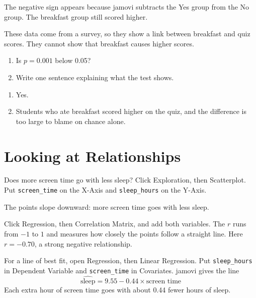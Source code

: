 The negative sign appears because jamovi subtracts the Yes group from the No group. The breakfast group still scored higher.

These data come from a survey, so they show a link between breakfast and quiz scores. They cannot show that breakfast causes higher scores.

\begin{Exercise}[title={Reading the t-Test}, label={ex:jamovi-ttest}]
\begin{enumerate}
\item Is $p = 0.001$ below 0.05?
\item Write one sentence explaining what the test shows.
\end{enumerate}
\end{Exercise}
\begin{Answer}[ref={ex:jamovi-ttest}]
\begin{enumerate}
\item Yes.
\item Students who ate breakfast scored higher on the quiz, and the difference is too large to blame on chance alone.
\end{enumerate}
\end{Answer}

\section{Looking at Relationships}

Does more screen time go with less sleep? Click Exploration, then Scatterplot. Put \texttt{screen\_time} on the X-Axis and \texttt{sleep\_hours} on the Y-Axis.


The points slope downward: more screen time goes with less sleep.

Click Regression, then Correlation Matrix, and add both variables. The  $r$ runs from $-1$ to $1$ and measures how closely the points follow a straight line. Here $r = -0.70$, a strong negative relationship.

For a line of best fit, open Regression, then Linear Regression. Put \texttt{sleep\_hours} in Dependent Variable and \texttt{screen\_time} in Covariates. jamovi gives the line
\[
\widehat{\text{sleep}} = 9.55 - 0.44 \times \text{screen time}
\]
Each extra hour of screen time goes with about 0.44 fewer hours of sleep.

